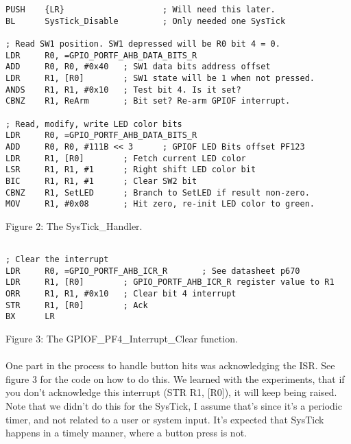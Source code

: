 \documentclass[12pt,a4paper]{report}
\begin{document}
\medskip

\lstset{language=[x86masm]Assembler}
\begin{lstlisting}
PUSH    {LR}                    ; Will need this later.
BL      SysTick_Disable         ; Only needed one SysTick
        
; Read SW1 position. SW1 depressed will be R0 bit 4 = 0.
LDR     R0, =GPIO_PORTF_AHB_DATA_BITS_R
ADD     R0, R0, #0x40   ; SW1 data bits address offset
LDR     R1, [R0]        ; SW1 state will be 1 when not pressed.
ANDS    R1, R1, #0x10   ; Test bit 4. Is it set?
CBNZ    R1, ReArm       ; Bit set? Re-arm GPIOF interrupt.
        
; Read, modify, write LED color bits
LDR     R0, =GPIO_PORTF_AHB_DATA_BITS_R
ADD     R0, R0, #111B << 3      ; GPIOF LED Bits offset PF123
LDR     R1, [R0]        ; Fetch current LED color
LSR     R1, R1, #1      ; Right shift LED color bit
BIC     R1, R1, #1      ; Clear SW2 bit
CBNZ    R1, SetLED      ; Branch to SetLED if result non-zero.
MOV     R1, #0x08       ; Hit zero, re-init LED color to green.

\end{lstlisting}	
\begin{center}
\small{Figure 2: The SysTick\_Handler.}
\end{center}


\lstset{language=[x86masm]Assembler}
\begin{lstlisting}

; Clear the interrupt 
LDR     R0, =GPIO_PORTF_AHB_ICR_R       ; See datasheet p670
LDR     R1, [R0]        ; GPIO_PORTF_AHB_ICR_R register value to R1
ORR     R1, R1, #0x10   ; Clear bit 4 interrupt
STR     R1, [R0]        ; Ack
BX      LR

\end{lstlisting}	
\begin{center}
\small{Figure 3: The GPIOF\_PF4\_Interrupt\_Clear function.}
\end{center}

\paragraph{}
One part in the process to handle button hits was acknowledging the ISR. See figure 3 for the code on how to do this. We learned with the experiments, that if you don't acknowledge this interrupt (STR R1, [R0]), it will keep being raised. Note that we didn't do this for the SysTick, I assume that's since it's a periodic timer, and not related to a user or system input. It's expected that SysTick happens in a timely manner, where a button press is not. 
\end{document}
